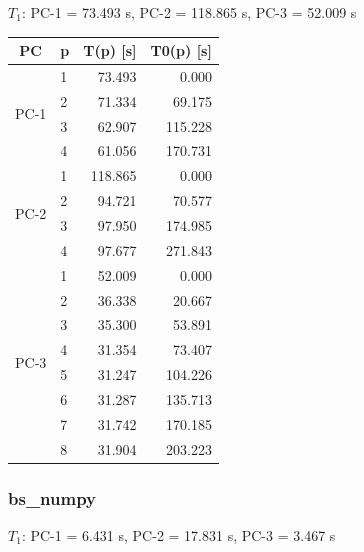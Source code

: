 \documentclass[11pt]{article}
\begin{document}
$T_1$: PC-1 = 73.493 s, PC-2 = 118.865 s, PC-3 = 52.009 s

\begin{center}
\begin{tabular}{clrr}
\toprule
PC & p & T(p) [s] & T0(p) [s] \\
\midrule
\multirow{4}{*}{PC-1} & 1 & 73.493 & 0.000 \\
 & 2 & 71.334 & 69.175 \\
 & 3 & 62.907 & 115.228 \\
 & 4 & 61.056 & 170.731 \\
\midrule
\multirow{4}{*}{PC-2} & 1 & 118.865 & 0.000 \\
 & 2 & 94.721 & 70.577 \\
 & 3 & 97.950 & 174.985 \\
 & 4 & 97.677 & 271.843 \\
\midrule
\multirow{8}{*}{PC-3} & 1 & 52.009 & 0.000 \\
 & 2 & 36.338 & 20.667 \\
 & 3 & 35.300 & 53.891 \\
 & 4 & 31.354 & 73.407 \\
 & 5 & 31.247 & 104.226 \\
 & 6 & 31.287 & 135.713 \\
 & 7 & 31.742 & 170.185 \\
 & 8 & 31.904 & 203.223 \\
\bottomrule
\end{tabular}
\end{center}

\subsubsection*{bs\_numpy}

$T_1$: PC-1 = 6.431 s, PC-2 = 17.831 s, PC-3 = 3.467 s
\end{document}
